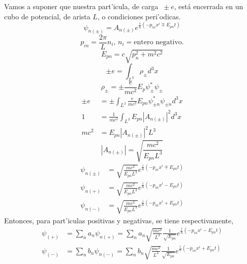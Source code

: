 Vamos a suponer que nuestra part'icula, de carga $\ \pm e$, est\'{a}
encerrada en un cubo de potencial, de arista $L$, o condiciones
peri'odicas.
\begin{equation}
\psi_{n\left(  \pm\right)  }=A_{n\left(  \pm\right)  }e^{\frac{i}{\hbar
}\left(  -p_{in}x^{i}\mp E_{pn}t\right)  }%
\end{equation}
\begin{equation}
p_{in}=\frac{2\pi}{L}n_{i}\text{, }n_{i}=\text{entero negativo.}%
\end{equation}
\begin{equation}
E_{pn}=c\sqrt{p_{n}^{2}+m^{2}c^{2}}%
\end{equation}
\begin{equation}
\pm e=\int_{L^{3}}\rho_{\pm}d^{3}x
\end{equation}
\begin{equation}
\rho_{\pm}=\pm\frac{e}{mc^{2}}E_{p}\psi_{\pm}^{\ast}\psi_{\pm}%
\end{equation}
\begin{align*}
\pm e  & =\pm\int_{L^{3}}\frac{e}{mc^{2}}E_{pn}\psi_{\pm n}^{\ast}%
\psi_{\pm n}d^{3}x\\
1  & =\frac{1}{mc^{2}}\int_{L^{3}}E_{pn}\left|  A_{n\left(  \pm\right)
}\right|  ^{2}d^{3}x\\
mc^{2}  & =E_{pn}\left|  A_{n\left(  \pm\right)  }\right|  ^{2}L^{3}%
\end{align*}
\begin{equation}
\left|  A_{n\left(  \pm\right)  }\right|  =\sqrt{\frac{mc^{2}}{E_{pn}%
L^{3}}}%
\end{equation}
\begin{align*}
\psi_{n\left(  \pm\right)  }  & =\sqrt{\frac{mc^{2}}{E_{pn}L^{3}}}%
e^{\frac{i}{\hbar}\left(  -p_{in}x^{i}\mp E_{pn}t\right)  }\\
\psi_{n\left(  +\right)  }  & =\sqrt{\frac{mc^{2}}{E_{pn}L^{3}}}%
e^{\frac{i}{\hbar}\left(  -p_{in}x^{i}-E_{pn}t\right)  }\\
\psi_{n\left(  -\right)  }  & =\sqrt{\frac{mc^{2}}{E_{pn}L^{3}}}%
e^{\frac{i}{\hbar}\left(  -p_{in}x^{i}+E_{pn}t\right)  }%
\end{align*}
Entonces, para part'iculas positivas y negativas, se tiene
respectivamente,
\begin{align*}
\psi_{\left(  +\right)  }  & =\sum_{n}a_{n}\psi_{n\left(  +\right)  }=\sum
_{n}a_{n}\sqrt{\frac{mc^{2}}{L^{3}}}\frac{1}{\sqrt{E_{pn}}}e^{\frac
{i}{\hbar}\left(  -p_{in}x^{i}-E_{pn}t\right)  }\\
\psi_{\left(  -\right)  }  & =\sum_{n}b_{n}\psi_{n\left(  -\right)  }=\sum
_{n}b_{n}\sqrt{\frac{mc^{2}}{L^{3}}}\frac{1}{\sqrt{E_{pn}}}e^{\frac
{i}{\hbar}\left(  -p_{in}x^{i}+E_{pn}t\right)  }%
\end{align*}
